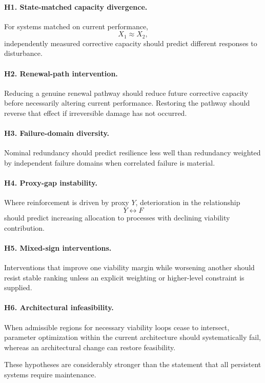 \paragraph{H1. State-matched capacity divergence.}
For systems matched on current performance,
\[
X_1\approx X_2,
\]
independently measured corrective capacity should predict different responses to disturbance.

\paragraph{H2. Renewal-path intervention.}
Reducing a genuine renewal pathway should reduce future corrective capacity before necessarily altering current performance. Restoring the pathway should reverse that effect if irreversible damage has not occurred.

\paragraph{H3. Failure-domain diversity.}
Nominal redundancy should predict resilience less well than redundancy weighted by independent failure domains when correlated failure is material.

\paragraph{H4. Proxy-gap instability.}
Where reinforcement is driven by proxy \(Y\), deterioration in the relationship
\[
Y\leftrightarrow F
\]
should predict increasing allocation to processes with declining viability contribution.

\paragraph{H5. Mixed-sign interventions.}
Interventions that improve one viability margin while worsening another should resist stable ranking unless an explicit weighting or higher-level constraint is supplied.

\paragraph{H6. Architectural infeasibility.}
When admissible regions for necessary viability loops cease to intersect, parameter optimization within the current architecture should systematically fail, whereas an architectural change can restore feasibility.

These hypotheses are considerably stronger than the statement that all persistent systems require maintenance.
